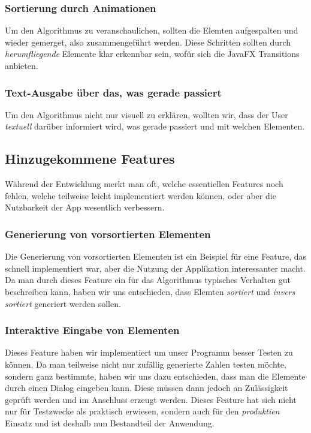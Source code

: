 \subsubsection{Sortierung durch Animationen}
Um den Algorithmus zu veranschaulichen, sollten die Elemten aufgespalten und wieder gemerget, also zusammengeführt werden. Diese Schritten sollten durch \textit{herumfliegende} Elemente klar erkennbar sein, wofür sich die JavaFX Transitions anbieten.

\subsubsection{Text-Ausgabe über das, was gerade passiert}
Um den Algorithmus nicht nur visuell zu erklären, wollten wir, dass der User \textit{textuell} darüber informiert wird, was gerade passiert und mit welchen Elementen.

\subsection{Hinzugekommene Features}
Während der Entwicklung merkt man oft, welche essentiellen Features noch fehlen, welche teilweise leicht implementiert werden können, oder aber die Nutzbarkeit der App wesentlich verbessern.
\subsubsection{Generierung von vorsortierten Elementen}
Die Generierung von vorsortierten Elementen ist ein Beispiel für eine Feature, das schnell implementiert war, aber die Nutzung der Applikation interessanter macht. Da man durch dieses Feature ein für das Algorithmus typisches Verhalten gut beschreiben kann, haben wir uns entschieden, dass Elemten \textit{sortiert} und \textit{invers sortiert} generiert werden sollen.

\subsubsection{Interaktive Eingabe von Elementen}
Dieses Feature haben wir implementiert um unser Programm besser Testen zu können. Da man teilweise nicht nur zufällig generierte Zahlen testen möchte, sondern ganz bestimmte, haben wir uns dazu entschieden, dass man die Elemente durch einen Dialog eingeben kann. Diese müssen dann jedoch an Zulässigkeit geprüft werden und im Anschluss erzeugt werden. Dieses Feature hat sich nicht nur für Testzwecke als praktisch erwiesen, sondern auch für den \textit{produktien} Einsatz und ist deshalb nun Bestandteil der Anwendung.

